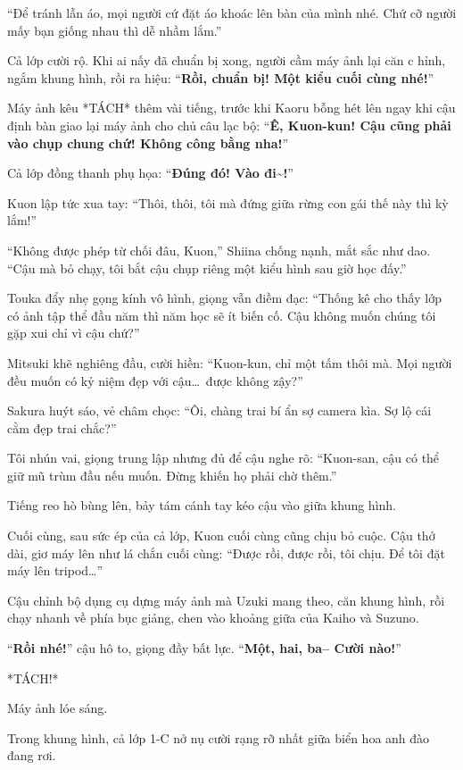 \documentclass[../main.tex]{subfiles}
\begin{document}
``Để tránh lẫn áo, mọi người cứ đặt áo khoác lên bàn của mình nhé. Chứ cỡ người mấy bạn giống nhau thì dễ nhầm lắm.''

Cả lớp cười rộ. Khi ai nấy đã chuẩn bị xong, người cầm máy ảnh lại căn c hỉnh, ngắm khung hình, rồi ra hiệu: ``\textbf{Rồi, chuẩn bị! Một kiểu cuối cùng nhé!}''

Máy ảnh kêu *TÁCH* thêm vài tiếng, trước khi Kaoru bỗng hét lên ngay khi cậu định bàn giao lại máy ảnh cho chủ câu lạc bộ: ``\textbf{Ê, Kuon-kun! Cậu cũng phải vào chụp chung chứ! Không công bằng nha!}''

Cả lớp đồng thanh phụ họa: ``\textbf{Đúng đó! Vào đi\~{}!}''

Kuon lập tức xua tay: ``Thôi, thôi, tôi mà đứng giữa rừng con gái thế này thì kỳ lắm!''

``Không được phép từ chối đâu, Kuon,'' Shiina chống nạnh, mắt sắc như dao. ``Cậu mà bỏ chạy, tôi bắt cậu chụp riêng một kiểu hình sau giờ học đấy.''

Touka đẩy nhẹ gọng kính vô hình, giọng vẫn điềm đạc: ``Thống kê cho thấy lớp có ảnh tập thể đầu năm thì năm học sẽ ít biến cố. Cậu không muốn chúng tôi gặp xui chỉ vì cậu chứ?''

Mitsuki khẽ nghiêng đầu, cười hiền: ``Kuon-kun, chỉ một tấm thôi mà. Mọi người đều muốn có kỷ niệm đẹp với cậu\dots\ được không zậy?''

Sakura huýt sáo, vẻ châm chọc: ``Ôi, chàng trai bí ẩn sợ camera kìa. Sợ lộ cái cằm đẹp trai chắc?''

Tôi nhún vai, giọng trung lập nhưng đủ để cậu nghe rõ: ``Kuon-san, cậu có thể giữ mũ trùm đầu nếu muốn. Đừng khiến họ phải chờ thêm.''

Tiếng reo hò bùng lên, bảy tám cánh tay kéo cậu vào giữa khung hình.

Cuối cùng, sau sức ép của cả lớp, Kuon cuối cùng cũng chịu bỏ cuộc. Cậu thở dài, giơ máy lên như lá chắn cuối cùng: ``Được rồi, được rồi, tôi chịu. Để tôi đặt máy lên tripod\dots''

Cậu chỉnh bộ dụng cụ dựng máy ảnh mà Uzuki mang theo, căn khung hình, rồi chạy nhanh về phía bục giảng, chen vào khoảng giữa của Kaiho và Suzuno.

``\textbf{Rồi nhé!}'' cậu hô to, giọng đầy bất lực. ``\textbf{Một, hai, ba-- Cười nào!}''

*TÁCH!*

Máy ảnh lóe sáng.

Trong khung hình, cả lớp 1-C nở nụ cười rạng rỡ nhất giữa biển hoa anh đào đang rơi.
\end{document}
